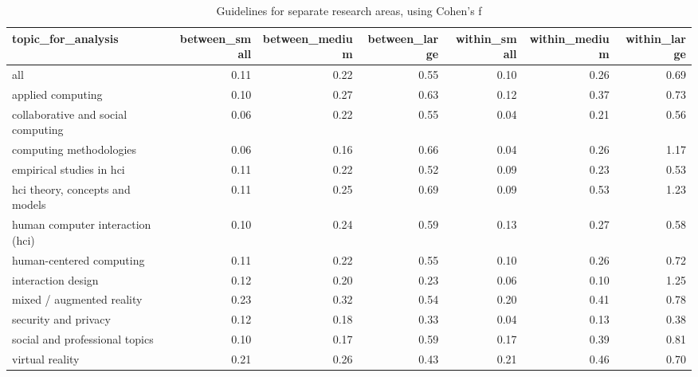 \begin{table}[ht]
\centering
\begin{tabular}{lrrrrrr}
  \hline
topic\_for\_analysis & between\_small & between\_medium & between\_large & within\_small & within\_medium & within\_large \\ 
  \hline
all & 0.11 & 0.22 & 0.55 & 0.10 & 0.26 & 0.69 \\ 
  applied computing & 0.10 & 0.27 & 0.63 & 0.12 & 0.37 & 0.73 \\ 
  collaborative and social computing & 0.06 & 0.22 & 0.55 & 0.04 & 0.21 & 0.56 \\ 
  computing methodologies & 0.06 & 0.16 & 0.66 & 0.04 & 0.26 & 1.17 \\ 
  empirical studies in hci & 0.11 & 0.22 & 0.52 & 0.09 & 0.23 & 0.53 \\ 
  hci theory, concepts and models & 0.11 & 0.25 & 0.69 & 0.09 & 0.53 & 1.23 \\ 
  human computer interaction (hci) & 0.10 & 0.24 & 0.59 & 0.13 & 0.27 & 0.58 \\ 
  human-centered computing & 0.11 & 0.22 & 0.55 & 0.10 & 0.26 & 0.72 \\ 
  interaction design & 0.12 & 0.20 & 0.23 & 0.06 & 0.10 & 1.25 \\ 
  mixed / augmented reality & 0.23 & 0.32 & 0.54 & 0.20 & 0.41 & 0.78 \\ 
  security and privacy & 0.12 & 0.18 & 0.33 & 0.04 & 0.13 & 0.38 \\ 
  social and professional topics & 0.10 & 0.17 & 0.59 & 0.17 & 0.39 & 0.81 \\ 
  virtual reality & 0.21 & 0.26 & 0.43 & 0.21 & 0.46 & 0.70 \\ 
   \hline
\end{tabular}
\caption{Guidelines for separate research areas, using Cohen's f} 
\label{tab:es guidelines cohensf-es different topics}
\end{table}

